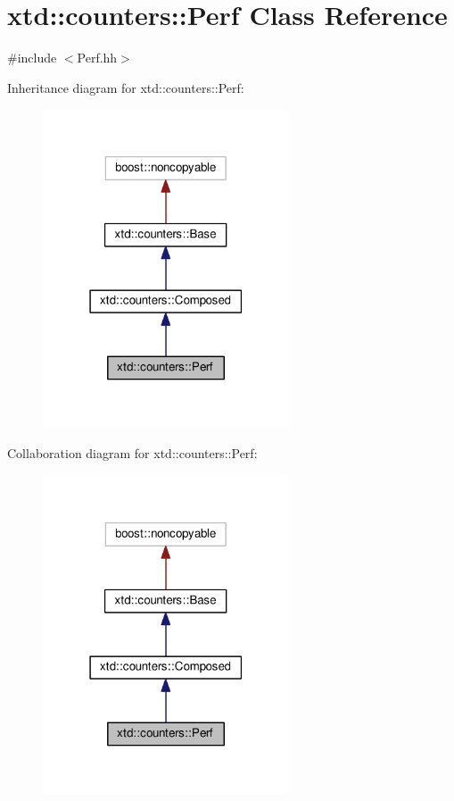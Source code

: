 \hypertarget{classxtd_1_1counters_1_1Perf}{}\section{xtd\+:\+:counters\+:\+:Perf Class Reference}
\label{classxtd_1_1counters_1_1Perf}


{\ttfamily \#include $<$Perf.\+hh$>$}



Inheritance diagram for xtd\+:\+:counters\+:\+:Perf\+:
\nopagebreak
\begin{figure}[H]
\begin{center}
\leavevmode
\includegraphics[width=207pt]{classxtd_1_1counters_1_1Perf__inherit__graph}
\end{center}
\end{figure}


Collaboration diagram for xtd\+:\+:counters\+:\+:Perf\+:
\nopagebreak
\begin{figure}[H]
\begin{center}
\leavevmode
\includegraphics[width=207pt]{classxtd_1_1counters_1_1Perf__coll__graph}
\end{center}
\end{figure}
